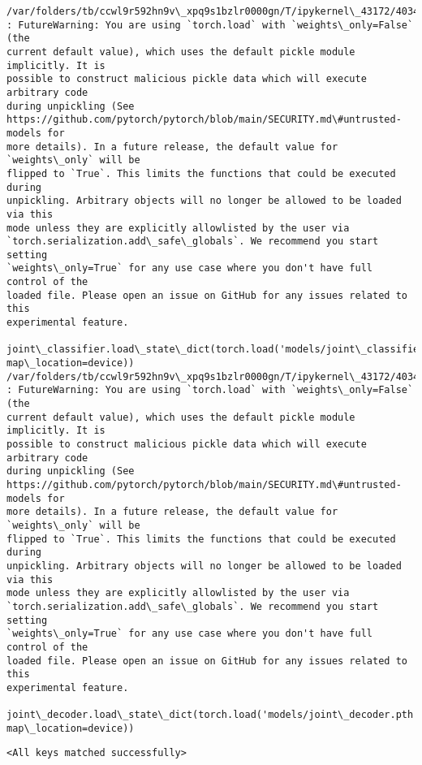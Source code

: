 \documentclass[11pt]{article}
\makeatletter
\newcommand{\boxspacing}{\kern\kvtcb@left@rule\kern\kvtcb@boxsep}
\newcommand{\prompt}[4]{
        {\ttfamily\llap{{\color{#2}[#3]:\hspace{3pt}#4}}\vspace{-\baselineskip}}
    }
\makeatother
\begin{document}
    \begin{Verbatim}[commandchars=\\\{\}]
/var/folders/tb/ccwl9r592hn9v\_xpq9s1bzlr0000gn/T/ipykernel\_43172/4034084385.py:5
: FutureWarning: You are using `torch.load` with `weights\_only=False` (the
current default value), which uses the default pickle module implicitly. It is
possible to construct malicious pickle data which will execute arbitrary code
during unpickling (See
https://github.com/pytorch/pytorch/blob/main/SECURITY.md\#untrusted-models for
more details). In a future release, the default value for `weights\_only` will be
flipped to `True`. This limits the functions that could be executed during
unpickling. Arbitrary objects will no longer be allowed to be loaded via this
mode unless they are explicitly allowlisted by the user via
`torch.serialization.add\_safe\_globals`. We recommend you start setting
`weights\_only=True` for any use case where you don't have full control of the
loaded file. Please open an issue on GitHub for any issues related to this
experimental feature.
  joint\_classifier.load\_state\_dict(torch.load('models/joint\_classifier.pth',
map\_location=device))
/var/folders/tb/ccwl9r592hn9v\_xpq9s1bzlr0000gn/T/ipykernel\_43172/4034084385.py:6
: FutureWarning: You are using `torch.load` with `weights\_only=False` (the
current default value), which uses the default pickle module implicitly. It is
possible to construct malicious pickle data which will execute arbitrary code
during unpickling (See
https://github.com/pytorch/pytorch/blob/main/SECURITY.md\#untrusted-models for
more details). In a future release, the default value for `weights\_only` will be
flipped to `True`. This limits the functions that could be executed during
unpickling. Arbitrary objects will no longer be allowed to be loaded via this
mode unless they are explicitly allowlisted by the user via
`torch.serialization.add\_safe\_globals`. We recommend you start setting
`weights\_only=True` for any use case where you don't have full control of the
loaded file. Please open an issue on GitHub for any issues related to this
experimental feature.
  joint\_decoder.load\_state\_dict(torch.load('models/joint\_decoder.pth',
map\_location=device))
    \end{Verbatim}

            \begin{tcolorbox}[breakable, size=fbox, boxrule=.5pt, pad at break*=1mm, opacityfill=0]
\prompt{Out}{outcolor}{ }{\boxspacing}
\begin{Verbatim}[commandchars=\\\{\}]
<All keys matched successfully>
\end{Verbatim}
\end{tcolorbox}
        
\end{document}
